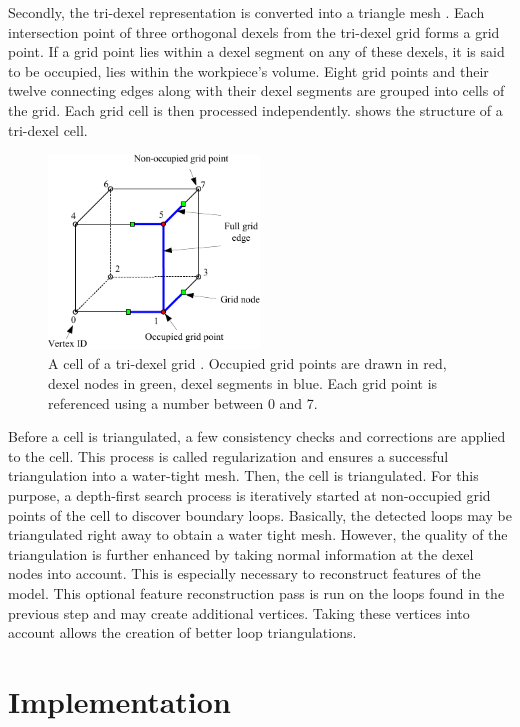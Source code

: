 Secondly, the tri-dexel representation is converted into a triangle mesh \cite{tridexel_reconstruction}.
Each intersection point of three orthogonal dexels from the tri-dexel grid forms a grid point.
If a grid point lies within a dexel segment on any of these dexels, it is said to be occupied, \ie lies within the workpiece's volume.
Eight grid points and their twelve connecting edges along with their dexel segments are grouped into cells of the grid.
Each grid cell is then processed independently.
 shows the structure of a tri-dexel cell.
%
\begin{figure}
	\centering
	\includegraphics[width=0.5\textwidth]{images/tri_dexel_cell}
	\caption[Tri-dexel cell]{
		A cell of a tri-dexel grid \cite{tridexel_reconstruction}.
		Occupied grid points are drawn in red, dexel nodes in green, dexel segments in blue.
		Each grid point is referenced using a number between 0 and 7.
	}
	\label{fig:tri_dexel_cell}
\end{figure}
%
Before a cell is triangulated, a few consistency checks and corrections are applied to the cell.
This process is called regularization and ensures a successful triangulation into a water-tight mesh.
Then, the cell is triangulated.
For this purpose, a depth-first search process is iteratively started at non-occupied grid points of the cell to discover boundary loops.
Basically, the detected loops may be triangulated right away to obtain a water tight mesh.
However, the quality of the triangulation is further enhanced by taking normal information at the dexel nodes into account.
This is especially necessary to reconstruct features of the model.
This optional feature reconstruction pass is run on the loops found in the previous step and may create additional vertices.
Taking these vertices into account allows the creation of better loop triangulations.

\section{Implementation}
\label{sec:tri_dexel_implementation}

